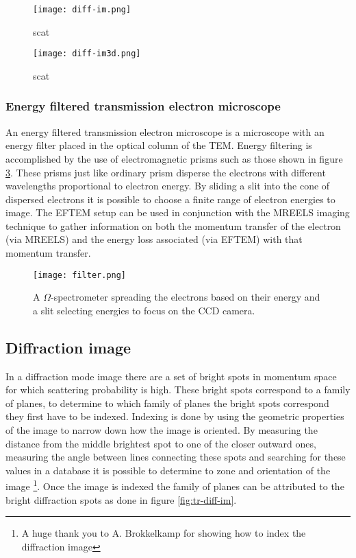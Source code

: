 \begin{figure}
	\centering
	\texttt{[image: diff-im.png]}
	\caption{scat}
	\label{fig:diff-im}
\end{figure}
\begin{figure}
	\centering
	\texttt{[image: diff-im3d.png]}
	\caption{scat}
	\label{fig:diff-im3d}
\end{figure}





\subsubsection{Energy filtered transmission electron microscope}
\label{sec:eftem}
An energy filtered transmission electron microscope is a microscope with an energy filter placed in the optical column of the TEM. Energy filtering is accomplished by the use of electromagnetic prisms such as those shown in figure \ref{fig:filter}.
These prisms just like ordinary prism disperse the electrons with different wavelengths proportional to electron energy. By sliding a slit into the cone of dispersed electrons it is possible to choose a finite range of electron energies to image.
The EFTEM setup can be used in conjunction with the MREELS imaging technique to gather information on both the momentum transfer of the electron (via MREELS) and the energy loss associated (via EFTEM) with that momentum transfer.

\begin{figure}
	\centering
	\texttt{[image: filter.png]}
	\caption{A $\Omega$-spectrometer spreading the electrons based on their energy and a slit selecting energies to focus on the CCD camera.}
	\label{fig:filter}
\end{figure}

\subsection{Diffraction image}
In a diffraction mode image there are a set of bright spots in momentum space for which scattering probability is high. These bright spots correspond to a family of planes, to determine to which family of planes the bright spots correspond they first have to be indexed. Indexing is done by using the geometric properties of the image to narrow down how the image is oriented.
By measuring the distance from the middle brightest spot to one of the closer outward ones, measuring the angle between lines connecting these spots and searching for these values in a database it is possible to determine to zone and orientation of the image \footnote{A huge thank you to A. Brokkelkamp for showing how to index the diffraction image}. Once the image is indexed the family of planes can be attributed to the bright diffraction spots as done in figure \ref{fig:tr-diff-im}.

